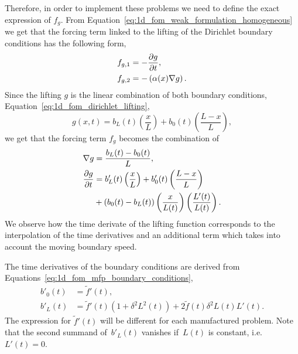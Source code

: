 \documentclass[../main.tex]{subfiles}
\begin{document}
Therefore, in order to implement these problems we need to define the exact expression of $f_g$.
From Equation~\eqref{eq:1d_fom_weak_formulation_homogeneous} we get that the forcing term linked to the lifting of the Dirichlet boundary conditions has the following form,
\begin{align}
    f_{g,1} &= - \frac{\partial g}{\partial t}, \\
    f_{g,2} &= - \left(\alpha(x) \nabla g\right).
\end{align}
Since the lifting $g$ is the linear combination of both boundary conditions, Equation~\eqref{eq:1d_fom_dirichlet_lifting},
\begin{equation}
    g(x,t) = b_L(t) \left(\frac{x}{L}\right) + b_0(t) \left(\frac{L - x}{L}\right),
\end{equation}
we get that the forcing term $f_g$ becomes the combination of
\begin{subequations}
    \begin{align}
        \nabla g &= \frac{b_L(t) - b_0(t)}{L}, \\
        \pdv{g}{t} &= b'_L(t) \left(\frac{x}{L}\right) 
        + b'_0(t) \left(\frac{L - x}{L}\right) \\
        &+ \left(b_0(t) - b_L(t)\right) \left(\frac{x}{L(t)}\right)\left(\frac{L'(t)}{L(t)}\right) \nonumber.
    \end{align}
\end{subequations}
We observe how the time derivate of the lifting function corresponds to the interpolation of the time derivatives and an additional term which takes into account the moving boundary speed.

The time derivatives of the boundary conditions are derived from Equations~\eqref{eq:1d_fom_mfp_boundary_conditions}, 
\begin{subequations}
    \begin{align}
        b'_0(t) &= \tilde{f}'(t), \\
        b'_L(t) &= \tilde{f}'(t)\left(1 + \delta^2L^2(t)\right) + 2\tilde{f}(t) \delta^2 L(t)L'(t).
    \end{align}
\end{subequations}
The expression for $\tilde{f}'(t)$ will be different for each manufactured problem.
Note that the second summand of~$b'_L(t)$ vanishes if~$L(t)$ is constant, i.e. $L'(t)=0$.  
\end{document}
